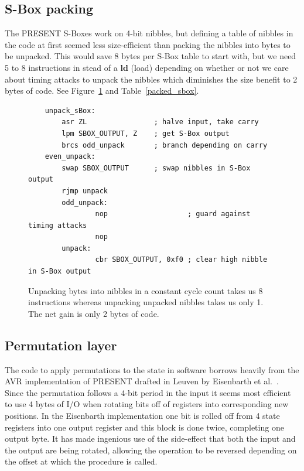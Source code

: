 \documentclass[11pt]{article}
\begin{document}
\subsection{S-Box packing}\label{sbox_packing}
The PRESENT S-Boxes work on 4-bit nibbles, but defining a table of nibbles in the code at first seemed less size-efficient than packing the nibbles into bytes to be unpacked.
This would save 8 bytes per S-Box table to start with, but we need 5 to 8 instructions in stead of a \textbf{ld} (load) depending on whether or not we care about timing attacks to unpack the nibbles which diminishes the size benefit to 2 bytes of code. See Figure~\ref{unpacking_code} and Table~\ref{packed_sbox}.

\begin{figure}
\begin{lstlisting}
	unpack_sBox:
		asr ZL                ; halve input, take carry
		lpm SBOX_OUTPUT, Z    ; get S-Box output
		brcs odd_unpack       ; branch depending on carry
	even_unpack:
		swap SBOX_OUTPUT      ; swap nibbles in S-Box output
		rjmp unpack
        odd_unpack:
                nop                   ; guard against timing attacks
                nop
        unpack:
                cbr SBOX_OUTPUT, 0xf0 ; clear high nibble in S-Box output
	\end{lstlisting}
	\caption{\footnotesize Unpacking bytes into nibbles in a constant cycle count takes us 8 instructions whereas unpacking unpacked nibbles takes us only 1. The net gain is only 2 bytes of code.}
\label{unpacking_code}
\end{figure}



\subsection{Permutation layer}
The code to apply permutations to the state in software borrows heavily from the AVR implementation of PRESENT drafted in Leuven by Eisenbarth et al.~\cite{eisenbarth2012compact}.
Since the permutation follows a 4-bit period in the input it seems most efficient to use 4 bytes of I/O when rotating bits off of registers into corresponding new positions.
In the Eisenbarth implementation one bit is rolled off from 4 state registers into one output register and this block is done twice, completing one output byte. It has made ingenious use of the side-effect that both the input and the output are being rotated, allowing the operation to be reversed depending on the offset at which the procedure is called.
\end{document}
